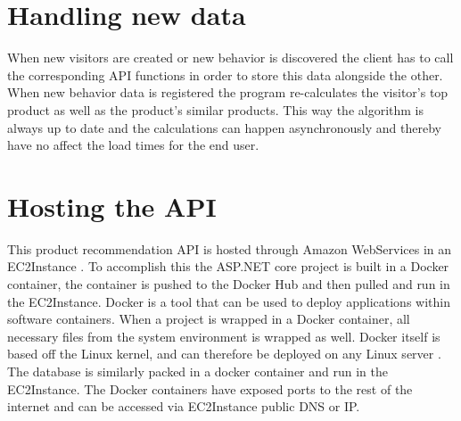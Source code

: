 \section{Handling new data}
When new visitors are created or new behavior is discovered the client has to call the corresponding API functions in order to store this data alongside the other. When new behavior data is registered the program re-calculates the visitor's top product as well as the product's similar products. This way the algorithm is always up to date and the calculations can happen asynchronously and thereby have no affect the load times for the end user.

\section{Hosting the API}
This product recommendation API is hosted through Amazon WebServices in an \gls{EC2Instance} \cite{EC2}. To accomplish this the ASP.NET core project is built in a Docker container, the container is pushed to the Docker Hub and then pulled and run in the \gls{EC2Instance}. Docker is a tool that can be used to deploy applications within software containers. When a project is wrapped in a Docker container, all necessary files from the system environment is wrapped as well. Docker itself is based off the Linux kernel, and can therefore be deployed on any Linux server \cite{Docker}.  The database is similarly packed in a docker container and run in the \gls{EC2Instance}. The Docker containers have exposed ports to the rest of the internet and can be accessed via \gls{EC2Instance} public DNS or IP.



			


 
